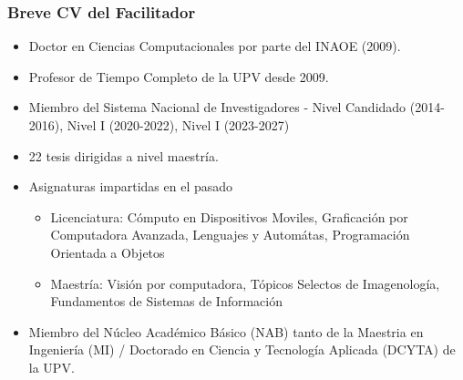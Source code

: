
\begin{frame}

\frametitle{Breve CV del Facilitador}
\begin{itemize}
\item Doctor en Ciencias Computacionales por parte del INAOE (2009).  
\item Profesor de Tiempo Completo de la UPV desde 2009.  
\item Miembro del Sistema Nacional de Investigadores - Nivel Candidado (2014-2016), Nivel I (2020-2022), Nivel I (2023-2027)
\item 22 tesis dirigidas a nivel maestría.
\item Asignaturas impartidas en el pasado 
\begin{itemize}
\item Licenciatura: Cómputo en Dispositivos Moviles, Graficación por Computadora Avanzada, Lenguajes y Automátas, Programación Orientada a Objetos
\item Maestr\'ia: Visi\'on por computadora, T\'opicos Selectos de Imagenolog\'ia, Fundamentos de Sistemas de Informaci\'on
\end{itemize}
\item Miembro del N\'ucleo Acad\'emico B\'asico (NAB) tanto de la Maestria en Ingeniería (MI) / Doctorado en Ciencia y Tecnología Aplicada (DCYTA) de la UPV.
\end{itemize}
\end{frame}
